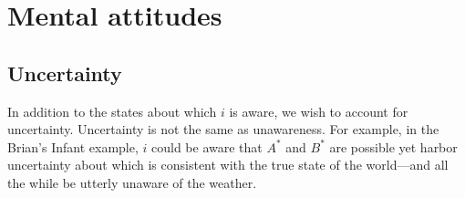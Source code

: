 \documentclass[
11pt,
titlepage,
reqno,
]{article}%
\theoremstyle{definition}
\begin{document}
	
\section{Mental attitudes}
	
\subsection{Uncertainty}
	
In addition to the states about which $i$ is aware, we wish to account for uncertainty. 
Uncertainty is not the same as unawareness.
For example, in the Brian's Infant example, $i$ could be aware that $A^\ast$ and $B^\ast$ are possible yet harbor uncertainty about which is consistent with the true state of the world---and all the while be utterly unaware of the weather.
\end{document}
